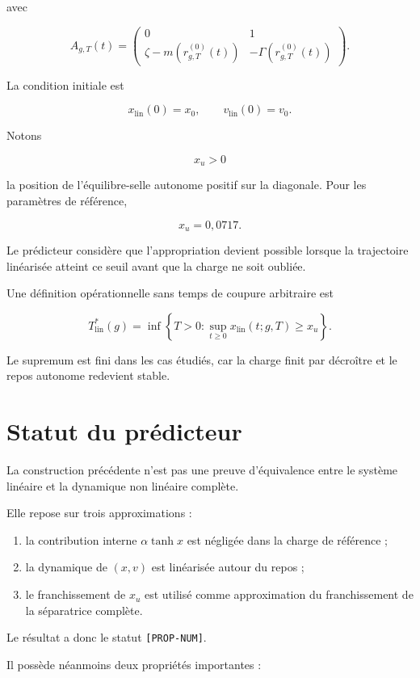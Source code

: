 avec

\[
\boxed{
A_{g,T}(t)
=
\begin{pmatrix}
0&1\\
\zeta-m(r_{g,T}^{(0)}(t))
&
-\Gamma(r_{g,T}^{(0)}(t))
\end{pmatrix}.
}
\]

La condition initiale est

\[
x_{\mathrm{lin}}(0)=x_0,
\qquad
v_{\mathrm{lin}}(0)=v_0.
\]

Notons

\[
x_u>0
\]

la position de l'équilibre-selle autonome positif sur la diagonale.
Pour les paramètres de référence,

\[
x_u=0{,}0717.
\]

Le prédicteur considère que l'appropriation devient possible lorsque
la trajectoire linéarisée atteint ce seuil avant que la charge ne soit
oubliée.

Une définition opérationnelle sans temps de coupure arbitraire est

\[
\boxed{
T_{\mathrm{lin}}^\ast(g)
=
\inf
\left\{
T>0:
\sup_{t\geq0}
x_{\mathrm{lin}}(t;g,T)
\geq
x_u
\right\}.
}
\]

Le supremum est fini dans les cas étudiés, car la charge finit par
décroître et le repos autonome redevient stable.

\section{Statut du prédicteur}
\label{annexe-resistance-statut-predicteur}

La construction précédente n'est pas une preuve d'équivalence entre le
système linéaire et la dynamique non linéaire complète.

Elle repose sur trois approximations :

\begin{enumerate}
\item
  la contribution interne \(\alpha\tanh x\) est négligée dans la
  charge de référence ;
\item
  la dynamique de \((x,v)\) est linéarisée autour du repos ;
\item
  le franchissement de \(x_u\) est utilisé comme approximation du
  franchissement de la séparatrice complète.
\end{enumerate}

Le résultat a donc le statut \texttt{[PROP-NUM]}.

Il possède néanmoins deux propriétés importantes :

